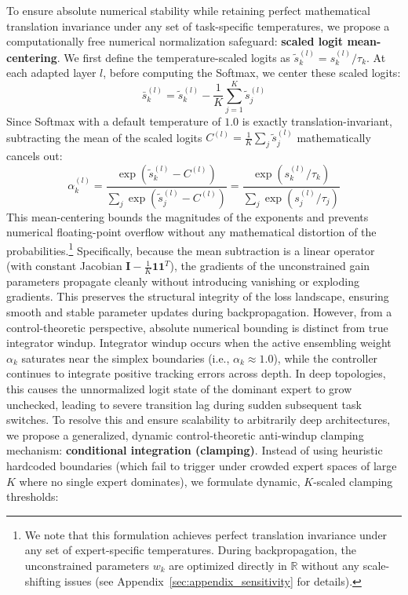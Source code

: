 To ensure absolute numerical stability while retaining perfect mathematical translation invariance under any set of task-specific temperatures, we propose a computationally free numerical normalization safeguard: \textbf{scaled logit mean-centering}. We first define the temperature-scaled logits as $\tilde{s}_k^{(l)} = s_k^{(l)} / \tau_k$. At each adapted layer $l$, before computing the Softmax, we center these scaled logits:
\begin{equation}
\bar{s}_k^{(l)} = \tilde{s}_k^{(l)} - \frac{1}{K} \sum_{j=1}^K \tilde{s}_j^{(l)}
\label{eq:anti_windup}
\end{equation}
Since Softmax with a default temperature of $1.0$ is exactly translation-invariant, subtracting the mean of the scaled logits $C^{(l)} = \frac{1}{K}\sum_j \tilde{s}_j^{(l)}$ mathematically cancels out:
\begin{equation}
\alpha_k^{(l)} = \frac{\exp\left(\tilde{s}_k^{(l)} - C^{(l)}\right)}{\sum_j \exp\left(\tilde{s}_j^{(l)} - C^{(l)}\right)} = \frac{\exp\left(s_k^{(l)} / \tau_k\right)}{\sum_j \exp\left(s_j^{(l)} / \tau_j\right)}
\end{equation}
This mean-centering bounds the magnitudes of the exponents and prevents numerical floating-point overflow without any mathematical distortion of the probabilities.\footnote{We note that this formulation achieves perfect translation invariance under any set of expert-specific temperatures. During backpropagation, the unconstrained parameters $w_k$ are optimized directly in $\mathbb{R}$ without any scale-shifting issues (see Appendix~\ref{sec:appendix_sensitivity} for details).} Specifically, because the mean subtraction is a linear operator (with constant Jacobian $\mathbf{I} - \frac{1}{K}\mathbf{1}\mathbf{1}^T$), the gradients of the unconstrained gain parameters propagate cleanly without introducing vanishing or exploding gradients. This preserves the structural integrity of the loss landscape, ensuring smooth and stable parameter updates during backpropagation. However, from a control-theoretic perspective, absolute numerical bounding is distinct from true integrator windup. Integrator windup occurs when the active ensembling weight $\alpha_k$ saturates near the simplex boundaries (i.e., $\alpha_k \approx 1.0$), while the controller continues to integrate positive tracking errors across depth. In deep topologies, this causes the unnormalized logit state of the dominant expert to grow unchecked, leading to severe transition lag during sudden subsequent task switches. To resolve this and ensure scalability to arbitrarily deep architectures, we propose a generalized, dynamic control-theoretic anti-windup clamping mechanism: \textbf{conditional integration (clamping)}. Instead of using heuristic hardcoded boundaries (which fail to trigger under crowded expert spaces of large $K$ where no single expert dominates), we formulate dynamic, $K$-scaled clamping thresholds:
